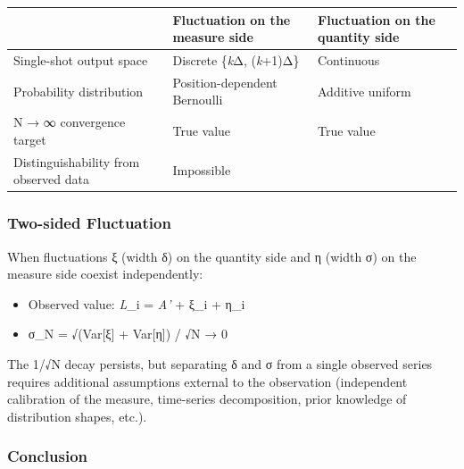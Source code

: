 \documentclass[
  11pt,
]{article}
\newcounter{none} %
\providecommand{\tightlist}{%
  \setlength{\itemsep}{0pt}\setlength{\parskip}{0pt}}
\begin{document}
{\def\LTcaptype{none} %
\begin{longtable}[]{@{}
  >{\raggedright\arraybackslash}p{}
  >{\raggedright\arraybackslash}p{}
  >{\raggedright\arraybackslash}p{}@{}}
\toprule\noalign{}
\begin{minipage}[b]{\linewidth}\raggedright
\end{minipage} & \begin{minipage}[b]{\linewidth}\raggedright
Fluctuation on the measure side
\end{minipage} & \begin{minipage}[b]{\linewidth}\raggedright
Fluctuation on the quantity side
\end{minipage} \\
\midrule\noalign{}
\endhead
\bottomrule\noalign{}
\endlastfoot
Single-shot output space & Discrete \{\emph{k}Δ, (\emph{k}+1)Δ\} &
Continuous \\
Probability distribution & Position-dependent Bernoulli & Additive
uniform \\
N → ∞ convergence target & True value & True value \\
Distinguishability from observed data & Impossible & \\
\end{longtable}
}

\subsubsection{Two-sided Fluctuation}\label{two-sided-fluctuation}

When fluctuations ξ (width δ) on the quantity side and η (width σ) on
the measure side coexist independently:

\begin{itemize}
\tightlist
\item
  Observed value: \emph{L}\_i = \emph{A'} + ξ\_i + η\_i
\item
  σ\_N = √(Var{[}ξ{]} + Var{[}η{]}) / √N → 0
\end{itemize}

The 1/√N decay persists, but separating δ and σ from a single observed
series requires additional assumptions external to the observation
(independent calibration of the measure, time-series decomposition,
prior knowledge of distribution shapes, etc.).

\subsubsection{Conclusion}\label{conclusion-1}
\end{document}
